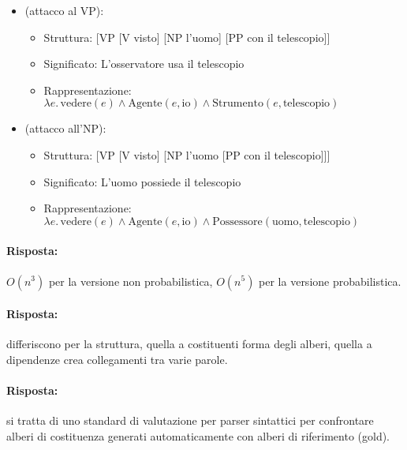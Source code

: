 \begin{itemize}
  \item {} (attacco al VP):
  \begin{itemize}
    \item Struttura: [VP [V visto] [NP l'uomo] [PP con il telescopio]]
    \item Significato: L'osservatore usa il telescopio
    \item Rappresentazione: $\lambda e.\,\text{vedere}(e) \land \text{Agente}(e,\text{io}) \land \text{Strumento}(e,\text{telescopio})$
  \end{itemize}

  \item {} (attacco all'NP):
  \begin{itemize}
    \item Struttura: [VP [V visto] [NP l'uomo [PP con il telescopio]]]
    \item Significato: L'uomo possiede il telescopio
    \item Rappresentazione: $\lambda e.\,\text{vedere}(e) \land \text{Agente}(e,\text{io}) \land \text{Possessore}(\text{uomo},\text{telescopio})$
  \end{itemize}
\end{itemize}



\paragraph{Risposta:} $O(n^3)$ per la versione non probabilistica, $O(n^5)$ per la versione probabilistica. 


\paragraph{Risposta:} differiscono per la struttura, quella a costituenti forma degli alberi, quella a dipendenze crea collegamenti tra varie parole.


\paragraph{Risposta:} si tratta di uno standard di valutazione per parser sintattici per confrontare alberi di costituenza generati automaticamente con alberi di riferimento (gold).

